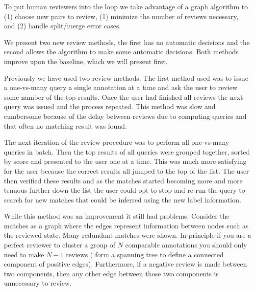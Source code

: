 To put human reviewers into the loop we take advantage of a graph algorithm to
(1) choose new pairs to review,
(1) minimize the number of reviews necessary, and
(2) handle split/merge error cases.

We present two new review methods, the first has no automatic decisions and
  the second allows the algorithm to make some automatic decisions.
Both methods improve upon the baseline, which we will present first.

Previously we have used two review methods.
The first method used was to issue a one-vs-many query a single annotation at
  a time and ask the user to review some number of the top results.
Once the user had finished all reviews the next query was issued and the
  process repeated.
This method was slow and cumbersome because of the delay between reviews due
  to computing queries and that often no matching result was found.

The next iteration of the review procedure was to perform all one-vs-many
  queries in batch.
Then the top results of all queries were grouped together, sorted by score and
  presented to the user one at a time.
This was much more satisfying for the user because the correct results all
  jumped to the top of the list.
The user then verified these results and as the matches started becoming more
  and more tenuous further down the list the user could opt to stop and re-run
  the query to search for new matches that could be inferred using the new label
  information.

While this method was an improvement it still had problems.
Consider the matches as a graph where the edges represent information between
  nodes such as the reviewed state.
Many redundant matches were shown.
In principle if you are a perfect reviewer to cluster a group of $N$
  comparable annotations you should only need to make $N-1$ reviews (\ie{} form
  a spanning tree to define a connected component of positive edges).
Furthermore, if a negative review is made between two components, then any
  other edge between those two components is unnecessary to review.

